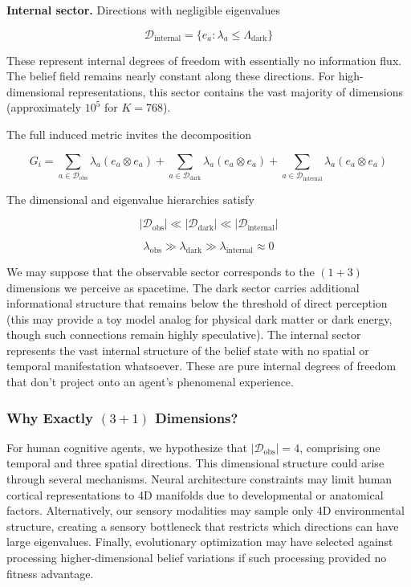 \documentclass[11pt]{article}
\begin{document}
\textbf{Internal sector.} Directions with negligible eigenvalues

\begin{equation}
\mathcal{D}_{\text{internal}} = \{e_a : \lambda_a \leq \Lambda_{\text{dark}}\}
\end{equation}

These represent internal degrees of freedom with essentially no information flux.  The belief field remains nearly constant along these directions. For high-dimensional representations, this sector contains the vast majority of dimensions (approximately $10^5$ for $K=768$).

The full induced metric invites the decomposition

\begin{equation}
G_i = \sum_{a \in \mathcal{D}_{\text{obs}}} \lambda_a (e_a \otimes e_a)
+ \sum_{a \in \mathcal{D}_{\text{dark}}} \lambda_a (e_a \otimes e_a)
+ \sum_{a \in \mathcal{D}_{\text{internal}}} \lambda_a (e_a \otimes e_a)
\end{equation}

The dimensional and eigenvalue hierarchies satisfy

\begin{equation}
|\mathcal{D}_{\text{obs}}| \ll |\mathcal{D}_{\text{dark}}| \ll |\mathcal{D}_{\text{internal}}|
\end{equation}

\begin{equation}
\lambda_{\text{obs}} \gg \lambda_{\text{dark}} \gg \lambda_{\text{internal}} \approx 0
\end{equation}

We may suppose that the observable sector corresponds to the $(1+3)$ dimensions we perceive as spacetime. The dark sector carries additional informational structure that remains below the threshold of direct perception (this may provide a toy model analog for physical dark matter or dark energy, though such connections remain highly speculative). The internal sector represents the vast internal structure of the belief state with no spatial or temporal manifestation whatsoever. These are pure internal degrees of freedom that don't project onto an agent's phenomenal experience.

\subsubsection{Why Exactly $(3+1)$ Dimensions?}

For human cognitive agents, we hypothesize that $|\mathcal{D}_{\text{obs}}| = 4$, comprising one temporal and three spatial directions. This dimensional structure could arise through several mechanisms. Neural architecture constraints may limit human cortical representations to 4D manifolds due to developmental or anatomical factors. Alternatively, our sensory modalities may sample only 4D environmental structure, creating a sensory bottleneck that restricts which directions can have large eigenvalues. Finally, evolutionary optimization may have selected against processing higher-dimensional belief variations if such processing provided no fitness advantage. 
\end{document}
